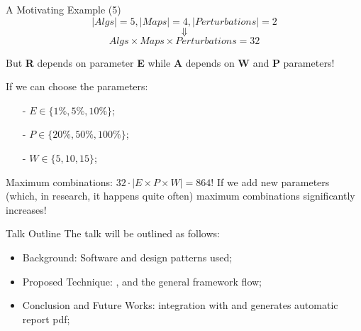 \begin{frame}{A Motivating Example (5)}
    $$|Algs| = 5, |Maps| = 4, |Perturbations| = 2$$ 
    $$\Downarrow$$
    $$Algs \times Maps \times Perturbations = 32$$

    But \textbf{R} depends on parameter \textbf{E} while \textbf{A} depends on \textbf{W} and \textbf{P} parameters!

    If we can choose the parameters:
    \begin{itemize}
        \item[-] $E \in \{1\%, 5\%, 10\% \}$;
        \item[-] $P \in \{20\%, 50\%, 100\% \}$;
        \item[-] $W \in \{5, 10, 15 \}$; 
    \end{itemize}
    
    Maximum combinations: $32 \cdot |E \times P \times W| = 864$!
    If we add new parameters (which, in research, it happens quite often) maximum combinations significantly increases!
\end{frame}

\begin{frame}{Talk Outline}
    The talk will be outlined as follows:
    \begin{itemize}
        \item Background: Software and design patterns used;
        \item Proposed Technique: ,  and the general framework flow;
        \item Conclusion and Future Works: integration with  and generates automatic report pdf;
    \end{itemize}
\end{frame}